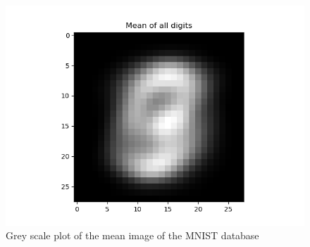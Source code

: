 \documentclass[12pt]{article}
\begin{document}
\begin{figure}[h!]
	\centering
	\includegraphics[width=0.66\linewidth]{../Problem_4/Problem_4.1.3_2.png}
	\caption{Grey scale plot of the mean image of the MNIST database}
	\label{fig:4.1.3}
\end{figure}
\end{document}
